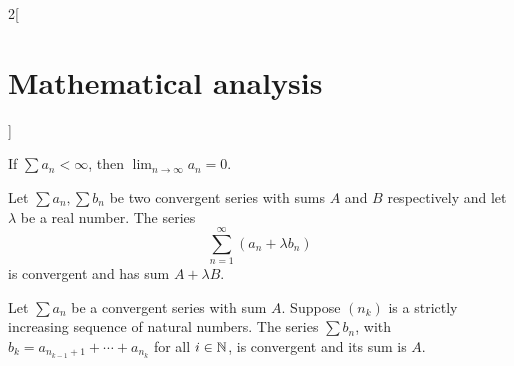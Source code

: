\documentclass[../../../main_math.tex]{subfiles}
\begin{document}
\begin{multicols}{2}[\section{Mathematical analysis}]
  \begin{corollary}
    If $\sum a_n<\infty$, then $\displaystyle\lim_{n\to \infty} a_n=0$.
  \end{corollary}
  \begin{theorem}[Linearity]
    Let $\sum a_n,\sum b_n$ be two convergent series with sums $A$ and $B$ respectively and let $\lambda$ be a real number. The series $$\sum_{n=1}^\infty (a_n+\lambda b_n)$$ is convergent and has sum $A+\lambda B$.
  \end{theorem}
  \begin{theorem}
    Let $\sum a_n$ be a convergent series with sum $A$. Suppose $(n_k)$ is a strictly increasing sequence of natural numbers. The series $\sum b_n$, with $b_k=a_{n_{k-1}+1}+\cdots+a_{n_k}$ for all $i\in\mathbb{N} $, is convergent and its sum is $A$.
  \end{theorem}

\end{multicols}
\end{document}
